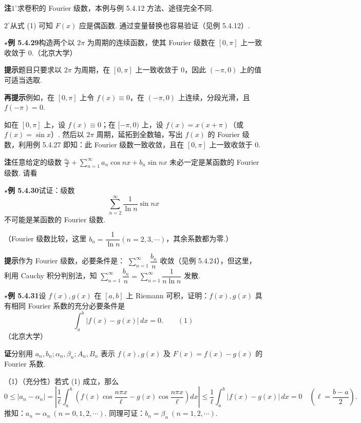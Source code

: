 \documentclass[UTF8,12pt,a4paper,fontset=fandol]{ctexart}
\begin{document}
\noindent\textbf{注}\quad $1^\circ$\quad 求卷积的 Fourier 级数，本例与例 5.4.12 方法、途径完全不同.

$2^\circ$\quad 从式 (1) 可知 $F(x)$ 应是偶函数. 通过变量替换也容易验证（见例 5.4.12）.

\noindent\(\star\)\textbf{例 5.4.29}\quad 构造两个以 $2\pi$ 为周期的连续函数，使其 Fourier 级数在 $[0,\pi]$ 上一致收敛于 0.（北京大学）

\noindent\textbf{提示}\quad 题目只要求以 $2\pi$ 为周期，在 $[0,\pi]$ 上一致收敛于 0，因此 $(-\pi,0)$ 上的值可适当选取.

\noindent\textbf{再提示}\quad 例如，在 $[0,\pi]$ 上令 $f(x)\equiv0$，在 $(-\pi,0)$ 上连续，分段光滑，且
$f(-\pi)=0$.

如在 $[0,\pi]$ 上，设 $f(x)\equiv0$；在 $[-\pi,0)$ 上，设 $f(x)=x(x+\pi)$（或 $f(x)=\sin x$）. 然后以 $2\pi$ 周期，延拓到全数轴，写出 $f(x)$ 的 Fourier 级数，利用例 5.4.27 即知：此 Fourier 级数一致收敛，且在 $[0,\pi]$ 上一致收敛于 0.

\noindent\textbf{注}\quad 任意给定的级数
$\displaystyle\frac{a_0}{2}+\sum_{n=1}^{\infty}a_n\cos nx+b_n\sin nx$
未必一定是某函数的 Fourier 级数. 请看

\noindent\(\star\)\textbf{例 5.4.30}\quad 试证：级数
\[
  \sum_{n=2}^{\infty}\frac1{\ln n}\sin nx
\]
不可能是某函数的 Fourier 级数.

（Fourier 级数比较，这里 $b_n=\dfrac1{\ln n}(n=2,3,\cdots)$，其余系数都为零.）

\noindent\textbf{提示}\quad 作为 Fourier 级数，必要条件是：
$\displaystyle\sum_{n=1}^{\infty}\dfrac{b_n}{n}$ 收敛（见例 5.4.24），但这里，利用 Cauchy 积分判别法，知
$\displaystyle\sum_{n=1}^{\infty}\dfrac{b_n}{n}
=\sum_{n=1}^{\infty}\dfrac1{n\ln n}$ 发散.

\noindent\(\star\)\textbf{例 5.4.31}\quad 设 $f(x),g(x)$ 在 $[a,b]$ 上 Riemann 可积，证明：$f(x),g(x)$ 具有相同 Fourier 系数的充分必要条件是
\[
  \int_a^b|f(x)-g(x)|\,dx=0. \qquad(1)
\]
（北京大学）

\noindent\textbf{证}\quad 分别用 $a_n,b_n;\alpha_n,\beta_n;A_n,B_n$ 表示 $f(x),g(x)$ 及
$F(x)=f(x)-g(x)$ 的 Fourier 系数.

（1）（充分性）若式 (1) 成立，那么
\[
  0\le |a_n-\alpha_n|=
  \left|\frac1{\ell}\int_a^b\left(f(x)\cos\frac{n\pi x}{\ell}
  -g(x)\cos\frac{n\pi x}{\ell}\right)dx\right|
  \le\frac1{\ell}\int_a^b|f(x)-g(x)|\,dx=0
  \quad\left(\ell=\frac{b-a}{2}\right).
\]
推知：$a_n=\alpha_n\ (n=0,1,2,\cdots)$. 同理可证：$b_n=\beta_n\ (n=1,2,\cdots)$.
\end{document}
